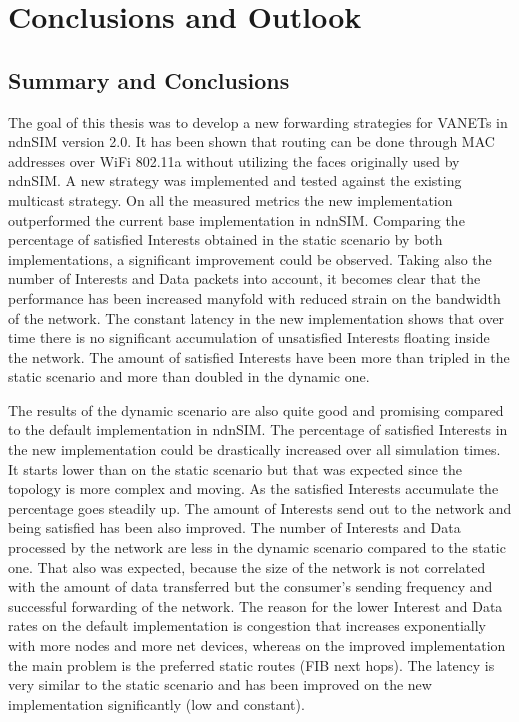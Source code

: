 \chapter{Conclusions and Outlook}


\section{Summary and Conclusions}

The goal of this thesis was to develop a new forwarding strategies for VANETs in ndnSIM version 2.0. It has been shown that routing can be done through MAC addresses over WiFi 802.11a without utilizing the faces originally used by ndnSIM. A new strategy was implemented and tested against the existing multicast strategy. On all the measured metrics the new implementation outperformed the current base implementation in ndnSIM.
Comparing the percentage of satisfied Interests obtained in the static scenario by both implementations, a significant improvement could be observed. Taking also the number of Interests and Data packets into account, it becomes clear that the performance has been increased manyfold with reduced strain on the bandwidth of the network. The constant latency in the new implementation shows that over time there is no significant accumulation of unsatisfied Interests floating inside the network. The amount of satisfied Interests have been more than tripled in the static scenario and more than doubled in the dynamic one.

\vspace{5mm} %

The results of the dynamic scenario are also quite good and promising compared to the default implementation in ndnSIM. The percentage of satisfied Interests in the new implementation could be drastically increased over all simulation times. It starts lower than on the static scenario but that was expected since the topology is more complex and moving. As the satisfied Interests accumulate the percentage goes steadily up. The amount of Interests send out to the network and being satisfied has been also improved. The number of Interests and Data processed by the network are less in the dynamic scenario compared to the static one. That also was expected, because the size of the network is not correlated with the amount of data transferred but the consumer's sending frequency and successful forwarding of the network. The reason for the lower Interest and Data rates on the default implementation is congestion that increases exponentially with more nodes and more net devices, whereas on the improved implementation the main problem is the preferred static routes (FIB next hops). The latency is very similar to the static scenario and has been improved on the new implementation significantly (low and constant).

